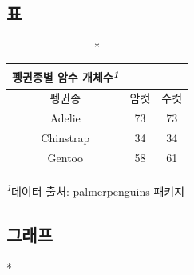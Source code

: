 \documentclass[
  letterpaper,
]{book}
\begin{document}
\begin{figure}

\begin{minipage}[t]{0.50\linewidth}

{\centering 

\hypertarget{uxd45c}{%
\subsection*{표}\label{uxd45c}}

\setlength{\LTpost}{0mm}
\begin{longtable*}{ccc}
\caption*{
{\large 펭귄종별 암수 개체수\textsuperscript{\textit{1}}}
} \\ 
\toprule
펭귄종 & 암컷 & 수컷 \\ 
\midrule
Adelie & 73 & 73 \\ 
Chinstrap & 34 & 34 \\ 
Gentoo & 58 & 61 \\ 
\bottomrule
\end{longtable*}
\begin{minipage}{\linewidth}
\textsuperscript{\textit{1}}데이터 출처: palmerpenguins 패키지\\
\end{minipage}

}

\end{minipage}%
%
\begin{minipage}[t]{0.50\linewidth}

{\centering 

\hypertarget{uxadf8uxb798uxd504}{%
\subsection*{그래프}\label{uxadf8uxb798uxd504}}

}

\end{minipage}%
\newline
\begin{minipage}[t]{0.50\linewidth}

{\centering 

}
\end{minipage}
\end{figure}
\end{document}
